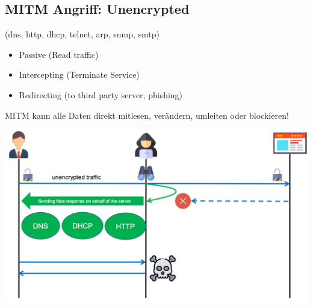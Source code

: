 \subsection{MITM Angriff: Unencrypted}\label{subsec:unencrypted-mitm-attack}
(dns, http, dhcp, telnet, arp, snmp, smtp)
\begin{itemize}
    \item Passive (Read traffic)
    \item Intercepting (Terminate Service)
    \item Redirecting (to third party server, phishing)
\end{itemize}
MITM kann alle Daten direkt mitlesen, verändern, umleiten oder blockieren!
\begin{center}
    \vspace{-8pt}
    \includegraphics[width=1.0\linewidth]{./img/09-mitm/mitm_unenctypt_2}
    \vspace{-8pt}
\end{center}


